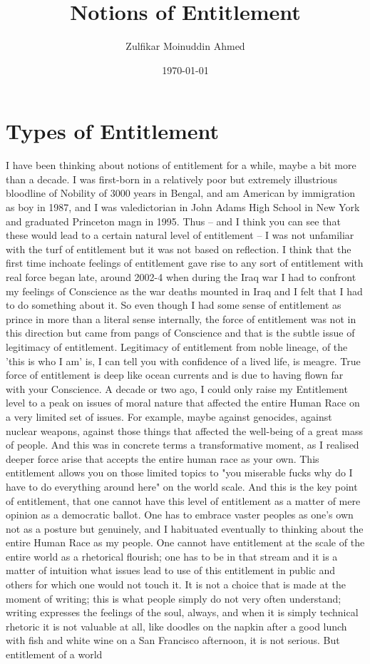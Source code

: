 \documentclass{amsart}
\title{Notions of Entitlement}
\author{Zulfikar Moinuddin Ahmed}
\date{\today}
\begin{document}
\maketitle


\section{Types of Entitlement}

I have been thinking about notions of entitlement for a while, maybe a bit more than a decade.  I was first-born in a relatively poor but extremely illustrious bloodline of Nobility of 3000 years in Bengal, and am American by immigration as boy in 1987, and I was valedictorian in John Adams High School in New York and graduated Princeton magn in 1995.  Thus -- and I think you can see that these would lead to a certain natural level of entitlement -- I was not unfamiliar with the turf of entitlement but it was not based on reflection.  I think that the first time inchoate feelings of entitlement gave rise to any sort of entitlement with real force began late, around 2002-4 when during the Iraq war I had to confront my feelings of Conscience as the war deaths mounted in Iraq and I felt that I had to do something about it.  So even though I had some sense of entitlement as  prince in more than a literal sense internally, the force of entitlement was not in this direction but came from pangs of Conscience and that is the subtle issue of legitimacy of entitlement.  Legitimacy of entitlement from noble lineage, of the 'this is who I am' is, I can tell you with confidence of a lived life, is meagre.  True force of entitlement is deep like ocean currents and is due to having flown far with your Conscience.  A decade or two ago, I could only raise my Entitlement level to a peak on issues of moral nature that affected the entire Human Race on a very limited set of issues.  For example,  maybe against genocides, against nuclear weapons, against those things that affected the well-being of a great mass of people.  And this was in concrete terms a transformative moment, as I realised deeper force arise that accepts the entire human race as your own.  This entitlement allows you on those limited topics to "you miserable fucks why do I have to do everything around here" on the world scale. And this is the key point of entitlement, that one cannot have this level of entitlement as a matter of mere opinion as a democratic ballot.  One has to embrace vaster peoples as one's own not as a posture but genuinely, and I habituated eventually to thinking about the entire Human Race as my people.  One cannot have entitlement at the scale of the entire world as a rhetorical flourish; one has to be in that stream and it is a matter of intuition what issues lead to use of this entitlement in public and others for which one would not touch it.  It is not a choice that is made at the moment of writing; this is what people simply do not very often understand; writing expresses the feelings of the soul, always, and when it is simply technical rhetoric it is not valuable at all, like doodles on the napkin after a good lunch with fish and white wine on a San Francisco afternoon, it is not serious.  But entitlement of a world 
\end{document}
